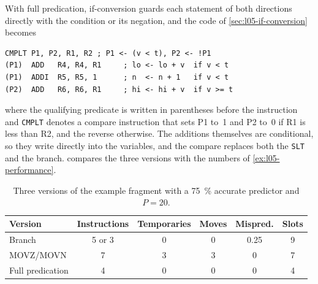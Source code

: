 \documentclass[../main.tex]{subfiles}
\begin{document}
\begin{example}
  \label{ex:l05-full}
  With full predication, if-conversion guards each statement of both
  directions directly with the condition or its negation, and the code of
  \cref{sec:l05-if-conversion} becomes
  \begin{lstlisting}[language={[x86masm]Assembler}, numbers=none]
      CMPLT P1, P2, R1, R2 ; P1 <- (v < t), P2 <- !P1
(P1)  ADD   R4, R4, R1     ; lo <- lo + v  if v < t
(P1)  ADDI  R5, R5, 1      ; n  <- n + 1   if v < t
(P2)  ADD   R6, R6, R1     ; hi <- hi + v  if v >= t
\end{lstlisting}
  where the qualifying predicate is written in parentheses before the
  instruction and \texttt{CMPLT} denotes a compare instruction that sets P1
  to~1 and P2 to~0 if R1 is less than R2, and the reverse otherwise.  The additions
  themselves are conditional, so they write directly into the variables, and
  the compare replaces both the \texttt{SLT} and the branch.
   compares the three versions with the numbers of
  \cref{ex:l05-performance}.
\end{example}

\begin{table}[htbp]
  \centering\small
  \caption{Three versions of the example fragment with a \SI{75}{\percent}
    accurate predictor and $P = 20$.}
  \label{tab:l05-versions}
  \begin{tabular}{@{}lccccc@{}}
    \toprule
    Version & Instructions & Temporaries & Moves & Mispred. & Slots \\
    \midrule
    Branch           & 5 or 3 & 0 & 0 & 0.25 & 9 \\
    MOVZ/MOVN        & 7      & 3 & 3 & 0    & 7 \\
    Full predication & 4      & 0 & 0 & 0    & 4 \\
    \bottomrule
  \end{tabular}
\end{table}
\end{document}
